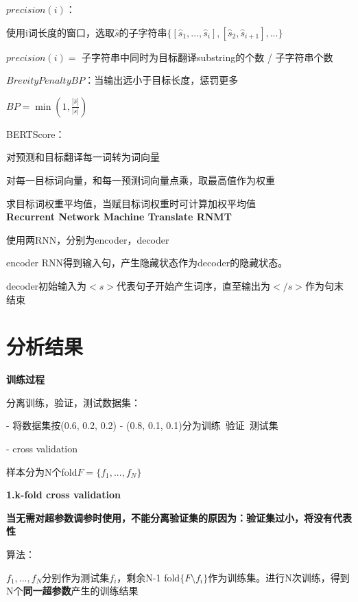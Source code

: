 \documentclass[UTF8]{ctexart}
\begin{document}
  \quad \quad $precision(i)$：
  
  \quad \quad \quad 使用i词长度的窗口，选取$\hat{s}$的子字符串$\{ [\hat{s}_1, ..., \hat{s}_i], [\hat{s}_2, \hat{s}_{i+1}], ... \}$

  \quad \quad \quad $precision(i) = $ 子字符串中同时为目标翻译substring的个数 / 子字符串个数

  \quad \quad $Brevity Penalty BP$：当输出远小于目标长度，惩罚更多

  \quad \quad \quad $BP = \min(1, \frac{|\hat{s}|}{|s|})$

  BERTScore：

  \quad 对预测和目标翻译每一词转为词向量

  \quad 对每一目标词向量，和每一预测词向量点乘，取最高值作为权重

  \quad 求目标词权重平均值，当赋目标词权重时可计算加权平均值\\
\textbf{Recurrent Network Machine Translate RNMT}

  使用两RNN，分别为encoder，decoder

  encoder RNN得到输入句，产生隐藏状态作为decoder的隐藏状态。
  
  decoder初始输入为$<s>$代表句子开始产生词序，直至输出为$</s>$作为句末结束

  
\section{分析结果}
\noindent \textbf{训练过程}

  分离训练，验证，测试数据集：
  
  - 将数据集按(0.6, 0.2, 0.2) - (0.8, 0.1, 0.1)分为训练\ 验证\ 测试集

  - cross validation

  \quad 样本分为N个fold$F = \{f_1, ..., f_N\}$

  \quad \textbf{1.k-fold cross validation}

  \quad \quad \textbf{当无需对超参数调参时使用，不能分离验证集的原因为：验证集过小，将没有代表性}

  \quad \quad 算法：

  \quad \quad \quad $f_1, ..., f_N$分别作为测试集$f_i$，剩余N-1 fold$\{F\setminus f_i\}$作为训练集。进行N次训练，得到N个\textbf{同一超参数}产生的训练结果
  
\end{document}
